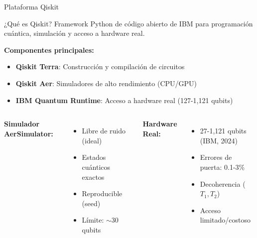 \documentclass[aspectratio=169]{beamer}
\begin{document}
\begin{frame}{Plataforma Qiskit}
\begin{block}{¿Qué es Qiskit?}
Framework Python de código abierto de IBM para programación cuántica, simulación y acceso a hardware real.
\end{block}

\textbf{Componentes principales:}
\begin{itemize}
\item \textbf{Qiskit Terra}: Construcción y compilación de circuitos
\item \textbf{Qiskit Aer}: Simuladores de alto rendimiento (CPU/GPU)
\item \textbf{IBM Quantum Runtime}: Acceso a hardware real (127-1,121 qubits)
\end{itemize}

\vspace{0.3cm}
\begin{columns}[c]
\textbf{Simulador AerSimulator:}
\begin{itemize}
\item Libre de ruido (ideal)
\item Estados cuánticos exactos
\item Reproducible (seed)
\item Límite: $\sim$30 qubits %
\end{itemize}

\textbf{Hardware Real:}
\begin{itemize}
\item 27-1,121 qubits (IBM, 2024)
\item Errores de puerta: 0.1-3\% %
\item Decoherencia ($T_1, T_2$)
\item Acceso limitado/costoso
\end{itemize}
\end{columns}
\end{frame}
\end{document}

